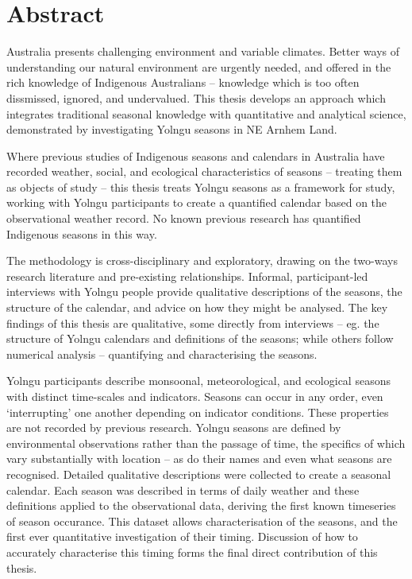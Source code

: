 \chapter{Abstract}

Australia presents challenging environment and variable climates.
Better ways of understanding our natural environment are urgently needed, and
offered in the rich knowledge of Indigenous Australians -- knowledge which
is too often dissmissed, ignored, and undervalued.
%
This thesis develops an approach which integrates traditional seasonal knowledge
with quantitative and analytical science, demonstrated by investigating Yolngu
seasons in NE Arnhem Land.

Where previous studies of Indigenous seasons and calendars in Australia have
recorded weather, social, and ecological characteristics of seasons -- treating
them as objects of study -- this thesis treats Yolngu seasons as a framework
for study, working with Yolngu participants to create a quantified calendar
based on the observational weather record.  No known previous research has quantified
Indigenous seasons in this way.


The methodology is cross-disciplinary and exploratory, drawing on the two-ways
research literature and pre-existing relationships.  Informal, participant-led
interviews with Yolngu people provide qualitative descriptions of the seasons, the structure of
the calendar, and advice on how they might be analysed.
%
The key findings of this thesis are qualitative, some directly from interviews
-- eg. the structure of Yolngu calendars and definitions of the seasons; while
others follow numerical analysis -- quantifying and characterising the seasons.


Yolngu participants describe monsoonal, meteorological, and ecological
seasons with distinct time-scales and indicators.  Seasons can occur in any
order, even `interrupting' one another depending on indicator conditions.
These properties are not recorded by previous research.
%
Yolngu seasons are defined by environmental observations rather than the
passage of time, the specifics of which vary substantially with location --
as do their names and even what seasons are recognised.  Detailed qualitative
descriptions were collected to create a seasonal calendar.
%
Each season was described in terms of daily weather and these definitions
applied to the observational data, deriving the first known timeseries of
season occurance.  This dataset allows characterisation of the seasons,
and the first ever quantitative investigation of their timing.  Discussion
of how to accurately characterise this timing forms the final direct
contribution of this thesis.

